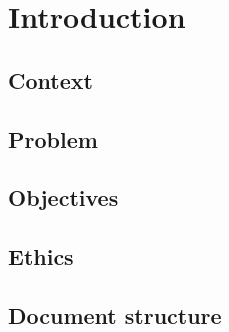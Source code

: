 % 
\chapter{Introduction} %
\label{chap:Chapter1} %


%
\section{Context} 

\section{Problem}

\section{Objectives}

\section{Ethics}

\section{Document structure} 
